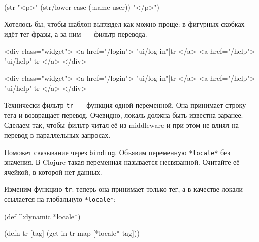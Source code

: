 \else

\begin{english}
  \begin{clojure}
(str "<p>" (str/lower-case (:name user)) "</p>")
  \end{clojure}
\end{english}

\fi

Хотелось бы, чтобы шаблон выглядел как можно проще: в фигурных скобках идёт тег
фразы, а за ним~--- фильтр перевода.

\ifnarrow

\begin{english}
  \begin{htmldjango}
<div class="widget">
  <a href="/login">
    {{ "ui/log-in"|tr }}
  </a>
  <a href="/help">
    {{ "ui/help"|tr }}
  </a>
</div>
  \end{htmldjango}
\end{english}

\else

\begin{english}
  \begin{htmldjango}
<div class="widget">
  <a href="/login">{{ "ui/log-in"|tr }}</a>
  <a href="/help">{{ "ui/help"|tr }}</a>
</div>
  \end{htmldjango}
\end{english}

\fi

Технически фильтр \verb|tr|~--- функция одной переменной. Она принимает строку
тега и возвращает перевод. Очевидно, локаль должна быть известна
заранее. Сделаем так, чтобы фильтр читал её из middleware и при этом не влиял на
перевод в параллельных запросах.

Поможет связывание через \verb|binding|. Объявим переменную \verb|*locale*| без
значения. В Clojure такая переменная называется несвязанной. Считайте её
ячейкой, в которой нет данных.

Изменим функцию \verb|tr|: теперь она принимает только тег, а в качестве
локали ссылается на глобальную \verb|*locale*|:

\pagebreakafive

\begin{english}
  \begin{clojure}
(def ^:dynamic *locale*)

(defn tr [tag]
  (get-in tr-map [*locale* tag]))
  \end{clojure}
\end{english}

